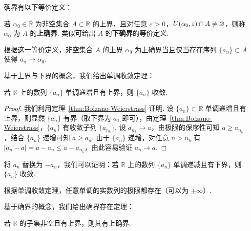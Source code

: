 \documentclass[../main.tex]{subfiles}
\begin{document}
确界有以下等价定义：

\begin{definition}[确界的等价定义] \label{def:sup-inf-equiv}
    若 $\alpha_0 \in \overline{\mathbb R}$ 为非空集合 $A \subset \mathbb R$ 的上界，且对任意 $\varepsilon > 0$，$U(\alpha_0, \varepsilon) \cap A \neq \varnothing$，则称 $\alpha_0$ 为 $A$ 的\textbf{上确界}. 类似可给出 $A$ 的\textbf{下确界}的等价定义. 
\end{definition}

\begin{remark}
    根据这一等价定义，非空集合 $A$ 的上界 $\alpha_0$ 为上确界当且仅当存在序列 $\{a_n\} \subset A$ 使得 $a_n \to \alpha_0$. 
\end{remark}

基于上界与下界的概念，我们给出单调收敛定理：

\begin{theorem}[单调收敛定理] \label{thm:monotone-convergence} 
    若 $\mathbb R$ 上的数列 $\{a_n\}$ 单调递增且有上界，则 $\{a_n\}$ 收敛. 
\end{theorem}

\begin{proof}
    我们利用定理~\ref{thm:Bolzano-Weierstrass} 证明. 设 $\{a_n\} \subset \mathbb R$ 单调递增且有上界，则显然 $\{a_n\}$ 有界（取下界为 $a_1$ 即可），由定理~\ref{thm:Bolzano-Weierstrass}，$\{a_n\}$ 有收敛子列 $\{a_{n_k}\}$. 设 $a_{n_k} \to a$，由极限的保序性可知 $a \geqslant a_{n_k}$，结合 $\{a_n\}$ 递增可知 $a \geqslant a_n$. 由于 $\{a_n\}$ 递增，对任意 $n > n_k$ 有 $|a_n - a| = a - a_n \leqslant a - a_{n_k}$，由此容易验证 $a_n \to a$. 
\end{proof}

\begin{remark}
    将 $a_n$ 替换为 $-a_n$，我们可以证明：若 $\mathbb R$ 上的数列 $\{a_n\}$ 单调递减且有下界，则 $\{a_n\}$ 收敛. 

    根据单调收敛定理，任意单调的实数列的极限都存在（可以为 $\pm \infty$）. 
\end{remark}

基于确界的概念，我们给出确界存在定理：

\begin{theorem}[确界存在定理] \label{thm:sup-inf-exist} 
    若 $\mathbb R$ 的子集非空且有上界，则其有上确界. 
\end{theorem}
\end{document}
